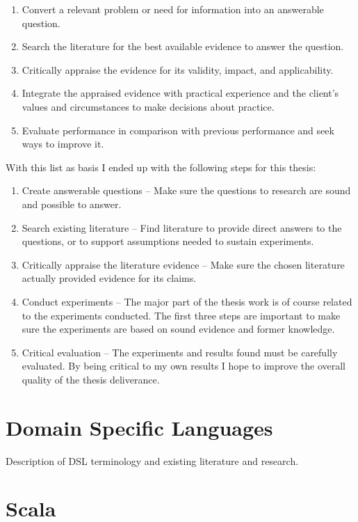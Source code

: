 \documentclass[a4paper,english]{report}
\begin{document}
\begin{enumerate}
\item Convert a relevant problem or need for information into an
  answerable question.
\item Search the literature for the best available evidence to answer
  the question.
\item Critically appraise the evidence for its validity, impact, and
  applicability.
\item Integrate the appraised evidence with practical experience and
  the client's values and circumstances to make decisions about
  practice.
\item Evaluate performance in comparison with previous performance and
  seek ways to improve it.
\end{enumerate}

With this list as basis I ended up with the following steps for this
thesis:

\begin{enumerate}
\item Create answerable questions -- Make sure the questions to
  research are sound and possible to answer.
\item Search existing literature -- Find literature to provide direct
  answers to the questions, or to support assumptions needed to
  sustain experiments.
\item Critically appraise the literature evidence -- Make sure the
  chosen literature actually provided evidence for its claims.
\item Conduct experiments -- The major part of the thesis work is of
  course related to the experiments conducted. The first three steps
  are important to make sure the experiments are based on sound
  evidence and former knowledge.
\item Critical evaluation -- The experiments and results found must be
  carefully evaluated. By being critical to my own results I hope to
  improve the overall quality of the thesis deliverance.
\end{enumerate}

\chapter{Domain Specific Languages}

Description of DSL terminology and existing literature and research.

\chapter{Scala}
\end{document}
